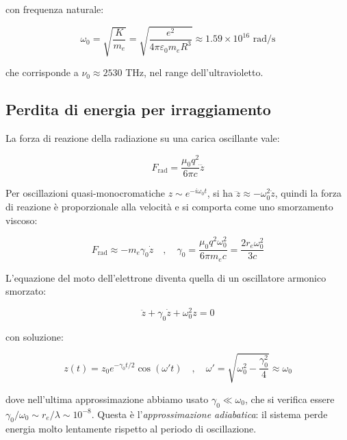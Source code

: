 con frequenza naturale:

\begin{equation}
    \omega_0 = \sqrt{\frac{K}{m_e}} = \sqrt{\frac{e^2}{4\pi\varepsilon_0 m_e R^3}} \approx 1.59 \times 10^{16}\text{ rad/s}
\end{equation}

che corrisponde a $\nu_0 \approx 2530$ THz, nel range dell'ultravioletto.\\

\subsection{Perdita di energia per irraggiamento}

La forza di reazione della radiazione su una carica oscillante vale:

\begin{equation}
    F_{\text{rad}} = \frac{\mu_0 q^2}{6\pi c} \dddot{z}
\end{equation}

Per oscillazioni quasi-monocromatiche $z \sim e^{-i\omega_0 t}$, si ha $\dddot{z} \approx -\omega_0^2\dot{z}$, quindi la forza di reazione è proporzionale alla velocità e si comporta come uno smorzamento viscoso:

\begin{equation}
    F_{\text{rad}} \approx -m_e\gamma_0\dot{z} \quad , \quad 
    \gamma_0 = \frac{\mu_0 q^2\omega_0^2}{6\pi m_e c} = 
    \frac{2r_e\omega_0^2}{3c}
\end{equation}

L'equazione del moto dell'elettrone diventa quella di un oscillatore armonico smorzato:

\begin{equation}
    \ddot{z} + \gamma_0\dot{z} + \omega_0^2 z = 0
\end{equation}

con soluzione:

\begin{equation}
    z(t) = z_0 e^{-\gamma_0 t/2}\cos(\omega' t) \quad , \quad \omega' = \sqrt{\omega_0^2 - \frac{\gamma_0^2}{4}} \approx \omega_0
\end{equation}

dove nell'ultima approssimazione abbiamo usato $\gamma_0 \ll \omega_0$, che si verifica essere $\gamma_0/\omega_0 \sim r_e/\lambda \sim 10^{-8}$.
Questa è l'\emph{approssimazione adiabatica}: il sistema perde energia molto lentamente rispetto al periodo di oscillazione. \\

